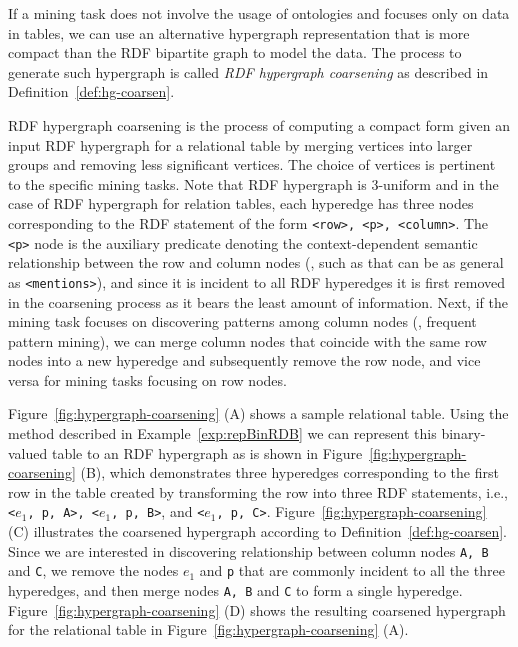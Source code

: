 If a mining task does not involve the usage of ontologies and focuses only on data in tables, we can use an alternative hypergraph representation that is more compact than the RDF bipartite graph to model the data. The process to generate such hypergraph is called \emph{RDF hypergraph coarsening} as described in Definition~\ref{def:hg-coarsen}.
 
\begin{mydef}
\label{def:hg-coarsen}
RDF hypergraph coarsening is the process of computing a compact form given an input RDF hypergraph for a relational table by merging vertices into larger groups and removing less significant vertices. The choice of vertices is pertinent to the specific mining tasks. Note that RDF hypergraph is 3-uniform and in the case of RDF hypergraph for relation tables, each hyperedge has three nodes corresponding to the RDF statement of the form \texttt{<row>, <p>, <column>}. The \texttt{<p>} node is the auxiliary predicate denoting the context-dependent semantic relationship between the row and column nodes (\eg, such as that can be as general as \texttt{<mentions>}), and since it is incident to all RDF hyperedges it is first removed in the coarsening process as it bears the least amount of information. Next, if the mining task focuses on discovering patterns among column nodes (\eg, frequent pattern mining), we can merge column nodes that coincide with the same row nodes into a new hyperedge and subsequently remove the row node, and vice versa for mining tasks focusing on row nodes. 
\end{mydef}

\begin{myexp}
\label{column-wise-hg}
Figure~\ref{fig:hypergraph-coarsening} (A) shows a sample relational table. Using the method described in Example~\ref{exp:repBinRDB} we can represent this binary-valued table to an RDF hypergraph as is shown in Figure~\ref{fig:hypergraph-coarsening} (B), which demonstrates three hyperedges corresponding to the first row in the table created by transforming the row into three RDF statements, i.e., \texttt{<$e_1$, p, A>, <$e_1$, p, B>}, and \texttt{<$e_1$, p, C>}. Figure~\ref{fig:hypergraph-coarsening} (C) illustrates the coarsened hypergraph according to Definition~\ref{def:hg-coarsen}. Since we are interested in discovering relationship between column nodes \texttt{A, B} and \texttt{C}, we remove the nodes \texttt{$e_1$} and \texttt{p} that are commonly incident to all the three hyperedges, and then merge nodes \texttt{A, B} and \texttt{C} to form a single hyperedge. Figure~\ref{fig:hypergraph-coarsening} (D) shows the resulting coarsened hypergraph for the relational table in Figure~\ref{fig:hypergraph-coarsening} (A).  
\end{myexp}

